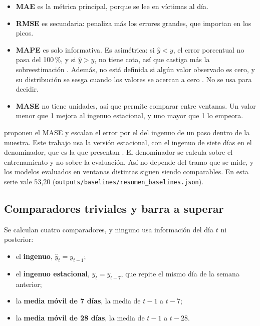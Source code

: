 \begin{itemize}
  \item \textbf{MAE} es la métrica principal, porque se lee en víctimas al día.
  \item \textbf{RMSE} es secundaria: penaliza más los errores grandes, que importan en los picos.
  \item \textbf{MAPE} es solo informativa. Es asimétrica: si $\hat{y} < y$, el error porcentual no pasa del 100\,\%, y si $\hat{y} > y$, no tiene cota, así que castiga más la sobreestimación \citep{hyndman2021}. Además, no está definida si algún valor observado es cero, y su distribución se sesga cuando los valores se acercan a cero \citep{hyndman2006}. No se usa para decidir.
  \item \textbf{MASE} no tiene unidades, así que permite comparar entre ventanas. Un valor menor que 1 mejora al ingenuo estacional, y uno mayor que 1 lo empeora.
\end{itemize}

\citet{hyndman2006} proponen el MASE y escalan el error por el del ingenuo de un paso dentro de la muestra. Este trabajo usa la versión estacional, con el ingenuo de siete días en el denominador, que es la que presentan \citet{hyndman2021}. El denominador se calcula sobre el entrenamiento y no sobre la evaluación. Así no depende del tramo que se mide, y los modelos evaluados en ventanas distintas siguen siendo comparables. En esta serie vale 53,20 (\texttt{outputs/\allowbreak{}baselines/\allowbreak{}resumen\_\allowbreak{}baselines.json}).

\subsection{Comparadores triviales y barra a superar}\label{sec:barra}

Se calculan cuatro comparadores, y ninguno usa información del día $t$ ni posterior:
\begin{itemize}
  \item el \textbf{ingenuo}, $\hat{y}_t = y_{t-1}$;
  \item el \textbf{ingenuo estacional}, $\hat{y}_t = y_{t-7}$, que repite el mismo día de la semana anterior;
  \item la \textbf{media móvil de 7 días}, la media de $t-1$ a $t-7$;
  \item la \textbf{media móvil de 28 días}, la media de $t-1$ a $t-28$.
\end{itemize}


